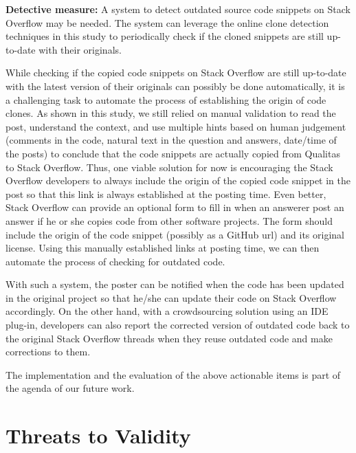 \documentclass[10pt,journal,compsoc]{IEEEtran}
\begin{document}
\textbf{Detective measure:} A
system to detect outdated source code snippets on Stack Overflow may be needed. The
system can leverage the online clone detection techniques in this study to
periodically check if the cloned snippets are still up-to-date with their
originals. 

While checking if the copied code snippets on Stack Overflow are still up-to-date with the latest version of their originals can possibly be done automatically, it is a challenging task to automate the process of establishing the origin of code clones. As shown in this study, we still relied on manual validation to read the post, understand the context, and use multiple hints based on human judgement (comments in the code, natural text in the question and answers, date/time of the posts) to conclude that the code snippets are actually copied from Qualitas to Stack Overflow. Thus, one viable solution for now is encouraging the Stack Overflow developers to always include the origin of the copied code snippet in the post so that this link is always established at the posting time. Even better, Stack Overflow can provide an optional form to fill in when an answerer post an answer if he or she copies code from other software projects. The form should include the origin of the code snippet (possibly as a GitHub url) and its original license. Using this manually established links at posting time, we can then automate the process of checking for outdated code.

With such a system, the poster can be notified when the code has been updated
in the original project so that he/she can update their code on Stack Overflow
accordingly. On the other hand, with a crowdsourcing solution using an IDE
plug-in, developers can also report the corrected version of outdated code back
to the original Stack Overflow threads when they reuse outdated code and make
corrections to them. 

The implementation and the evaluation of the
above actionable items is part of the agenda of our future work.

\section{Threats to Validity}
\end{document}
